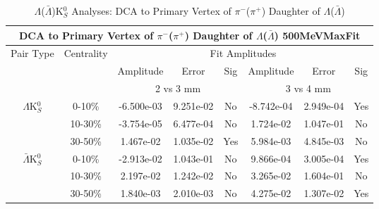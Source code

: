 \documentclass[../AnalysisNoteJBuxton.tex]{subfiles}
\begin{document}
\begin{table}
 \centering
 \begin{tabular}{|c|c|c|c|c||c|c|c|}
  \multicolumn{8}{c}{DCA to Primary Vertex of $\pi^{-}$($\pi^{+}$) Daughter of $\Lambda$($\bar{\Lambda}$) 500MeVMaxFit} \\
  \hline
  \multirow{3}{*}{Pair Type} & \multirow{3}{*}{Centrality} & \multicolumn{6}{c|}{Fit Amplitudes} \\
  \cline{3-8}
   & & Amplitude & Error & Sig & Amplitude & Error & Sig \\  
  \cline{3-8}
   & & \multicolumn{3}{c||}{2 vs 3 mm} & \multicolumn{3}{c|}{3 vs 4 mm} \\  
  \hline  
  \multirow{3}{*}{$\Lambda$K$^{0}_{S}$}  
   &  0-10\% & -6.500e-03 & 9.251e-02 & No & -8.742e-04 & 2.949e-04 & Yes \\
   & 10-30\% & -3.754e-05 & 6.477e-04 & No & 1.724e-02 & 1.047e-01 & No \\
   & 30-50\% & 1.467e-02 & 1.035e-02 & Yes & 5.984e-03 & 4.845e-03 & No \\
  \hline  
  \multirow{3}{*}{$\bar{\Lambda}$K$^{0}_{S}$}  
   &  0-10\% & -2.913e-02 & 1.043e-01 & No & 9.866e-04 & 3.005e-04 & Yes \\
   & 10-30\% & 2.197e-02 & 1.242e-02 & No & 3.265e-02 & 1.604e-01 & No \\
   & 30-50\% & 1.840e-03 & 2.010e-03 & No & 4.275e-02 & 1.307e-02 & Yes \\
  \hline
 \end{tabular}
 \caption{$\Lambda$($\bar{\Lambda}$)K$^{0}_{S}$ Analyses: DCA to Primary Vertex of $\pi^{-}$($\pi^{+}$) Daughter of $\Lambda$($\bar{\Lambda}$)}
 \label{tab:DcaToPrimVertexPionDaughtOfLamLamK0_500MeVMaxFit}
\end{table}
\end{document}
